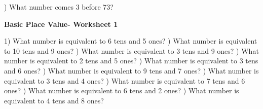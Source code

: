 \documentclass{article}%
\begin{document}
\newline%
\newline%
) What number comes 3 before 73?%
\newline%
\newline%
\newline%
\pagebreak%
\large%
\begin{center}%
\textbf{Basic Place Value- Worksheet 1}%
\newline%
\newline%
\newline%
\end{center} \normalsize%
1) What number is equivalent to 6 tens and 5 ones?%
\newline%
\newline%
) What number is equivalent to 10 tens and 9 ones?%
\newline%
\newline%
) What number is equivalent to 3 tens and 9 ones?%
\newline%
\newline%
) What number is equivalent to 2 tens and 5 ones?%
\newline%
\newline%
) What number is equivalent to 3 tens and 6 ones?%
\newline%
\newline%
) What number is equivalent to 9 tens and 7 ones?%
\newline%
\newline%
) What number is equivalent to 3 tens and 4 ones?%
\newline%
\newline%
) What number is equivalent to 7 tens and 6 ones?%
\newline%
\newline%
) What number is equivalent to 6 tens and 2 ones?%
\newline%
\newline%
) What number is equivalent to 4 tens and 8 ones?%
\newline%
\newline%
\end{document}
